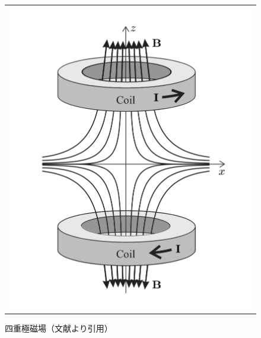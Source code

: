 \documentclass[uplatex,dvipdfmx,a4paper,report,papersize,11pt]{jsbook}
\begin{document}
\begin{figure}[htpb]
\begin{tabular}{c}
      \begin{minipage}{0.50\hsize}
        \centering
          \includegraphics[keepaspectratio, scale=0.50, angle=0]
                          {figures/MOT_magnetic_field.png}
                          \caption{四重極磁場（文献\cite{Foot:1080846}より引用）}
                          \label{MOT_magnetic_field}
      \end{minipage} \\



\end{tabular}
\end{figure}
\end{document}

